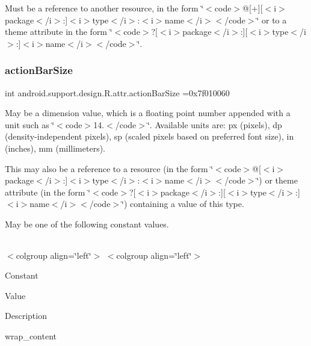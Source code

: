 Must be a reference to another resource, in the form \char`\"{}$<$code$>$@\mbox{[}+\mbox{]}\mbox{[}$<$i$>$package$<$/i$>$\+:\mbox{]}$<$i$>$type$<$/i$>$\+:$<$i$>$name$<$/i$>$$<$/code$>$\char`\"{} or to a theme attribute in the form \char`\"{}$<$code$>$?\mbox{[}$<$i$>$package$<$/i$>$\+:\mbox{]}\mbox{[}$<$i$>$type$<$/i$>$\+:\mbox{]}$<$i$>$name$<$/i$>$$<$/code$>$\char`\"{}. \mbox{\label{classandroid_1_1support_1_1design_1_1R_1_1attr_ad892efeaa3b9e4b0892ccc04c1e42f6a}} 
\subsubsection{\texorpdfstring{action\+Bar\+Size}{actionBarSize}}
{\footnotesize\ttfamily int android.\+support.\+design.\+R.\+attr.\+action\+Bar\+Size =0x7f010060\hspace{0.3cm}{\ttfamily [static]}}

May be a dimension value, which is a floating point number appended with a unit such as \char`\"{}$<$code$>$14.\+5sp$<$/code$>$\char`\"{}. Available units are\+: px (pixels), dp (density-\/independent pixels), sp (scaled pixels based on preferred font size), in (inches), mm (millimeters). 

This may also be a reference to a resource (in the form \char`\"{}$<$code$>$@\mbox{[}$<$i$>$package$<$/i$>$\+:\mbox{]}$<$i$>$type$<$/i$>$\+:$<$i$>$name$<$/i$>$$<$/code$>$\char`\"{}) or theme attribute (in the form \char`\"{}$<$code$>$?\mbox{[}$<$i$>$package$<$/i$>$\+:\mbox{]}\mbox{[}$<$i$>$type$<$/i$>$\+:\mbox{]}$<$i$>$name$<$/i$>$$<$/code$>$\char`\"{}) containing a value of this type. 

May be one of the following constant values.

\tabulinesep=1mm
\begin{longtabu} spread 0pt [c]{*{0}{|X[-1]}|}
\hline
\end{longtabu}
$<$colgroup align=\char`\"{}left\char`\"{}$>$ $<$colgroup align=\char`\"{}left\char`\"{}$>$ 

Constant

Value

Description 

{\ttfamily wrap\+\_\+content}

